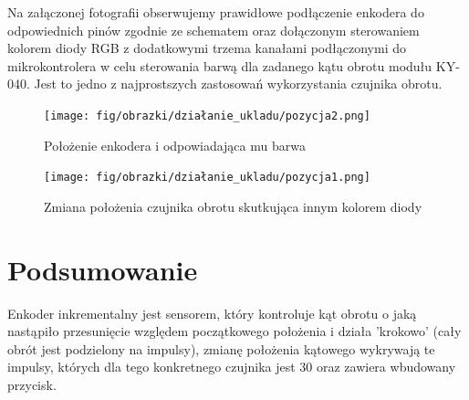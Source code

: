 \documentclass[11pt, a4paper]{article}
\begin{document}
Na załączonej fotografii obserwujemy prawidłowe podłączenie enkodera do odpowiednich pinów zgodnie ze schematem oraz dołączonym sterowaniem kolorem diody RGB z dodatkowymi trzema kanałami podłączonymi do mikrokontrolera w celu sterowania barwą dla zadanego kątu obrotu modułu KY-040. Jest to jedno z najprostszych zastosowań wykorzystania czujnika obrotu.


\vspace{0.5cm}
\begin{figure}[h!]
    \centering
    \texttt{[image: fig/obrazki/działanie\_ukladu/pozycja2.png]}
    \caption{Położenie enkodera i odpowiadająca mu barwa}
    \label{fig:my_label}
\end{figure}
\vspace{0.5cm}


\vspace{0.5cm}
\begin{figure}[h!]
    \centering
    \texttt{[image: fig/obrazki/działanie\_ukladu/pozycja1.png]}
    \caption{Zmiana położenia czujnika obrotu skutkująca innym kolorem diody}
    \label{fig:my_label}
\end{figure}
\vspace{0.5cm}




\section*{Podsumowanie} 
Enkoder inkrementalny jest sensorem, który kontroluje kąt obrotu o jaką nastąpiło przesunięcie względem początkowego położenia i działa 'krokowo' (cały obrót jest podzielony na impulsy), zmianę położenia kątowego wykrywają te impulsy, których dla tego konkretnego czujnika jest 30 oraz zawiera wbudowany przycisk. 



\printbibliography[heading=bibintoc]
\end{document}

